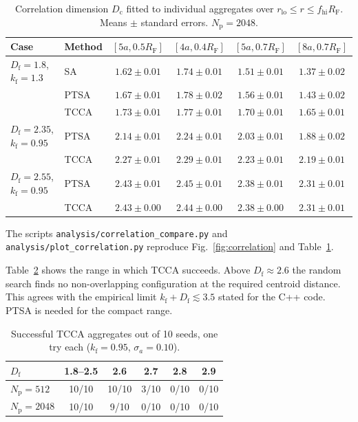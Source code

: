 \documentclass[11pt,a4paper]{article}
\newcommand{\Df}{D_\text{f}}
\newcommand{\kf}{k_\text{f}}
\newcommand{\RF}{R_\text{F}}
\begin{document}
\begin{table}[htbp]
  \centering
  \caption{Correlation dimension $D_\text{c}$ fitted to individual aggregates over $r_\text{lo} \le r \le f_\text{hi}\RF$.
  Means $\pm$ standard errors.
  $N_\text{p} = 2048$.}
  \label{tab:correlation}
  \small
  \begin{tabular}{llcccc}
    \toprule
    Case & Method & $[5a, 0.5\RF]$ & $[4a, 0.4\RF]$ & $[5a, 0.7\RF]$ & $[8a, 0.7\RF]$ \\
    \midrule
    $\Df = 1.8$, $\kf = 1.3$ & SA   & $1.62 \pm 0.01$ & $1.74 \pm 0.01$ & $1.51 \pm 0.01$ & $1.37 \pm 0.02$ \\
                              & PTSA & $1.67 \pm 0.01$ & $1.78 \pm 0.02$ & $1.56 \pm 0.01$ & $1.43 \pm 0.02$ \\
                              & TCCA & $1.73 \pm 0.01$ & $1.77 \pm 0.01$ & $1.70 \pm 0.01$ & $1.65 \pm 0.01$ \\
    \midrule
    $\Df = 2.35$, $\kf = 0.95$ & PTSA & $2.14 \pm 0.01$ & $2.24 \pm 0.01$ & $2.03 \pm 0.01$ & $1.88 \pm 0.02$ \\
                                & TCCA & $2.27 \pm 0.01$ & $2.29 \pm 0.01$ & $2.23 \pm 0.01$ & $2.19 \pm 0.01$ \\
    \midrule
    $\Df = 2.55$, $\kf = 0.95$ & PTSA & $2.43 \pm 0.01$ & $2.45 \pm 0.01$ & $2.38 \pm 0.01$ & $2.31 \pm 0.01$ \\
                                & TCCA & $2.43 \pm 0.00$ & $2.44 \pm 0.00$ & $2.38 \pm 0.00$ & $2.31 \pm 0.01$ \\
    \bottomrule
  \end{tabular}
\end{table}

The scripts \texttt{analysis/correlation\_compare.py} and \texttt{analysis/plot\_correlation.py} reproduce Fig.~\ref{fig:correlation} and Table~\ref{tab:correlation}.

Table~\ref{tab:feasibility} shows the range in which TCCA succeeds.
Above $\Df \approx 2.6$ the random search finds no non-overlapping configuration at the required centroid distance.
This agrees with the empirical limit $\kf + \Df \lesssim 3.5$ stated for the C++ code.
PTSA is needed for the compact range.

\begin{table}[htbp]
  \centering
  \caption{Successful TCCA aggregates out of 10 seeds, one try each ($\kf = 0.95$, $\sigma_a = 0.10$).}
  \label{tab:feasibility}
  \small
  \begin{tabular}{lccccc}
    \toprule
    $\Df$ & 1.8--2.5 & 2.6 & 2.7 & 2.8 & 2.9 \\
    \midrule
    $N_\text{p} = 512$  & 10/10 & 10/10 & 3/10 & 0/10 & 0/10 \\
    $N_\text{p} = 2048$ & 10/10 & 9/10  & 0/10 & 0/10 & 0/10 \\
    \bottomrule
  \end{tabular}
\end{table}
\end{document}
